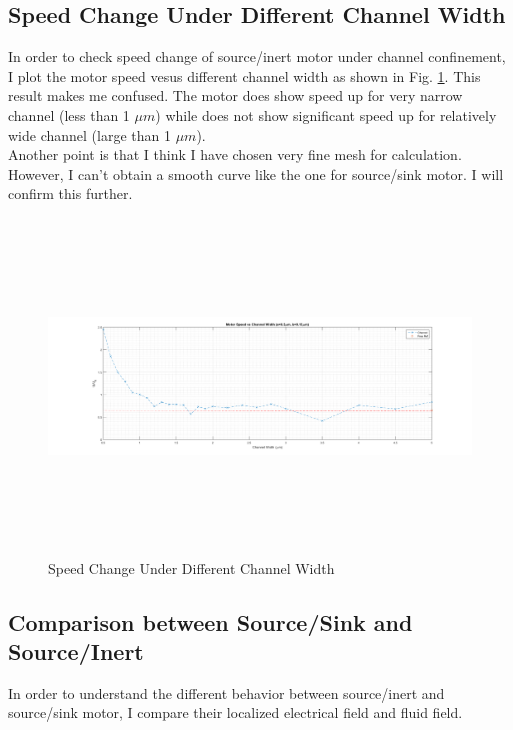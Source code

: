 \documentclass[fontsize=11pt, %
                             paper=a4, %
                             twoside, %
                             captions=tableheading,
                             index=totoc,
                             hyperref]{labbook}
\begin{document}
\begin{addmargin}[4cm]{0cm}
\subsection*{Speed Change Under Different Channel Width}
In order to check speed change of source/inert motor under channel confinement, I plot the motor speed vesus different channel width as shown in Fig. \ref{2016-11-13-SCUDCW}. This result makes me confused. The motor does show speed up for very narrow channel (less than 1 $\mu m$) while does not show significant speed up for relatively wide channel (large than 1 $\mu m$). \\
Another point is that I think I have chosen very fine mesh for calculation. However, I can't obtain a smooth curve like the one for source/sink motor\cite{Liu2016}. I will confirm this further.
\begin{figure}
\centering
\includegraphics[width=\linewidth, height=3.5in]{2016-11-13-DiffCWidth.png}
\caption{Speed Change Under Different Channel Width}\label{2016-11-13-SCUDCW}
\end{figure}
\subsection*{Comparison between Source/Sink and Source/Inert}
In order to understand the different behavior between source/inert and source/sink motor, I compare their localized electrical field and fluid field.

\end{addmargin}
\end{document}
